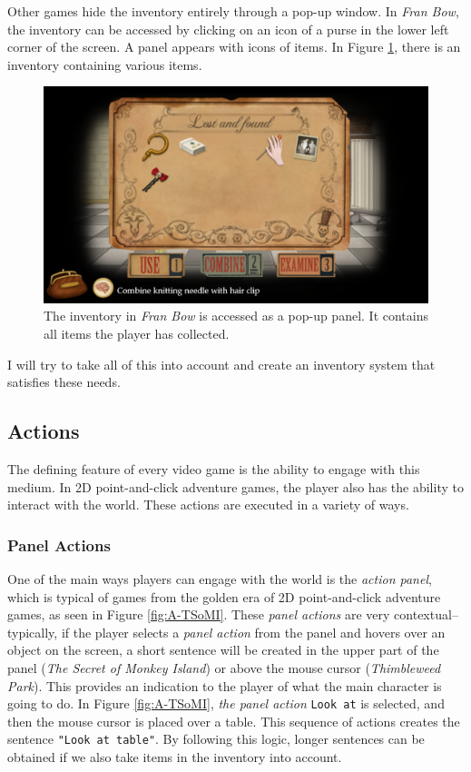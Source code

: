 Other games hide the inventory entirely through a pop-up window. In \textit{Fran Bow}, the inventory can be accessed by clicking on an icon of a purse in the lower left corner of the screen. A panel appears with icons of items. In Figure \ref{fig:I-FranBow}, there is an inventory containing various items.
\begin{figure}[H]
\centering
\includegraphics[width=1.\linewidth]{img/Fran_Bow.png}
\caption{The inventory in \textit{Fran Bow} is accessed as a pop-up panel. It contains all items the player has collected.}
\label{fig:I-FranBow}
\end{figure}

I will try to take all of this into account and create an inventory system that satisfies these needs.
 
\subsection{Actions}
The defining feature of every video game is the ability to engage with this medium. In 2D point-and-click adventure games, the player also has the ability to interact with the world. These actions are executed in a variety of ways.

\subsubsection{Panel Actions}
One of the main ways players can engage with the world is the \textit{action panel}, which is typical of games from the golden era of 2D point-and-click adventure games, as seen in Figure \ref{fig:A-TSoMI}. These \textit{panel actions} are very contextual--typically, if the player selects a \textit{panel action} from the panel and hovers over an object on the screen, a short sentence will be created in the upper part of the panel (\textit{The Secret of Monkey Island}) or above the mouse cursor (\textit{Thimbleweed Park}). This provides an indication to the player of what the main character is going to do. In Figure \ref{fig:A-TSoMI}, \textit{the panel action} \texttt{Look at} is selected, and then the mouse cursor is placed over a table. This sequence of actions creates the sentence \texttt{"Look at table"}. By following this logic, longer sentences can be obtained if we also take items in the inventory into account.


